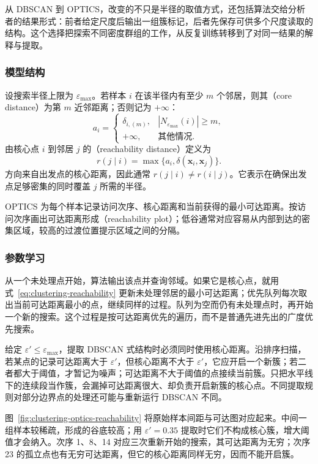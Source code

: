 从 DBSCAN 到 OPTICS，改变的不只是半径的取值方式，还包括算法交给分析者的结果形式：前者给定尺度后输出一组簇标记，后者先保存可供多个尺度读取的结构。这个选择把探索不同密度群组的工作，从反复训练转移到了对同一结果的解释与提取。

\subsubsection{模型结构}

设搜索半径上限为 $\varepsilon_{\max}$。若样本 $i$ 在该半径内有至少 $m$ 个邻居，则其（core distance）为第 $m$ 近邻距离；否则记为 $+\infty$：
\[
 a_i=
 \begin{cases}
 \delta_{i,(m)},&|N_{\varepsilon_{\max}}(i)|\geq m,\\
 +\infty,&\text{其他情况}.
 \end{cases}
\]
由核心点 $i$ 到邻居 $j$ 的（reachability distance）定义为
\begin{equation}
 r(j\mid i)=\max\{a_i,\delta(\bm{x}_i,\bm{x}_j)\}.
 \label{eq:clustering-reachability}
\end{equation}
方向来自出发点的核心距离，因此通常 $r(j\mid i)\ne r(i\mid j)$。它表示在确保出发点足够密集的同时覆盖 $j$ 所需的半径。

OPTICS 为每个样本记录访问次序、核心距离和当前获得的最小可达距离。按访问次序画出可达距离形成（reachability plot）；低谷通常对应容易从内部到达的密集区域，较高的过渡位置提示区域之间的分隔。

\subsubsection{参数学习}

从一个未处理点开始，算法输出该点并查询邻域。如果它是核心点，就用式~\eqref{eq:clustering-reachability} 更新未处理邻居的最小可达距离；优先队列每次取出当前可达距离最小的点，继续同样的过程。队列为空而仍有未处理点时，再开始一个新的搜索。这个过程是按可达距离优先的遍历，而不是普通先进先出的广度优先搜索。

给定 $\varepsilon'\leq\varepsilon_{\max}$，提取 DBSCAN 式结构时必须同时使用核心距离。沿排序扫描，若某点的记录可达距离大于 $\varepsilon'$，但核心距离不大于 $\varepsilon'$，它应开启一个新簇；若二者都大于阈值，才暂记为噪声；可达距离不大于阈值的点接续当前簇。只把水平线下的连续段当作簇，会漏掉可达距离很大、却负责开启新簇的核心点。不同提取规则对部分边界点的处理还可能与重新运行 DBSCAN 不同。

图~\ref{fig:clustering-optics-reachability} 将原始样本间距与可达图对应起来。中间一组样本较稀疏，形成的谷底较高；用 $\varepsilon'=0.35$ 提取时它们不构成核心簇，增大阈值才会纳入。次序 1、8、14 对应三次重新开始的搜索，其可达距离为无穷；次序 23 的孤立点也有无穷可达距离，但它的核心距离同样无穷，因而不能开启簇。

